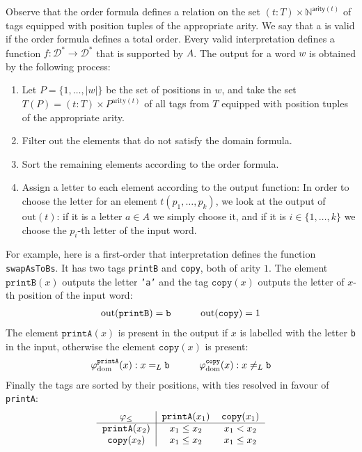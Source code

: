 Observe that the order formula defines a relation on the set $(t : T) \times \mathbb{N}^{\mathsf{arity}(t)}$ of tags 
equipped with position tuples of the appropriate arity. We say that a  is valid if
the order formula defines a total order. Every valid interpretation defines a function $f : \mathcal{D}^* \to \mathcal{D}^*$
that is supported by $A$. The output for a word $w$ is obtained by the following process:
\begin{enumerate}
    \item Let $P = \{1, \ldots, |w|\}$ be the set of positions in $w$, and take the set $T(P) = (t : T) \times P^{\text{arity}(t)}$
           of all tags from $T$ equipped with position tuples of the appropriate arity.
    \item Filter out the elements that do not satisfy the domain formula.
    \item Sort the remaining elements according to the order formula.
    \item Assign a letter to each element according to the output function: 
          In order to choose the letter for an element $t(p_1, \ldots, p_k)$, we look at the 
          output of $\text{out}(t)$: if it is a letter $a \in A$ we simply choose it,
          and if it is $i \in \{1, \ldots, k\}$ we choose the $p_i$-th letter of the input word.
\end{enumerate}

For example, here is a first-order that interpretation defines the function \texttt{swapAsToBs}. 
It has two tags \texttt{printB} and \texttt{copy}, both of arity $1$. 
The element $\mathtt{printB}(x)$ outputs the letter \texttt{'a'} and the tag $\mathtt{copy}(x)$
outputs the letter of $x$-th position of the input word:
\[
\begin{tabular}{ccc}
    $\text{out}(\mathtt{printB}) = \mathtt{b}$ & \ \ \ & $\text{out}(\mathtt{copy}) = 1$ \\
\end{tabular}
\]
The element $\mathtt{printA}(x)$ is present in the output if $x$ is labelled with the letter \texttt{b}
in the input, otherwise the element $\mathtt{copy}(x)$ is present:
\[
\begin{tabular}{ccc}
    $\varphi_{\text{dom}}^{\mathtt{printA}}(x) : x =_L \mathtt{b}$ & \ \ \  &$\varphi_{\text{dom}}^{\mathtt{copy}}(x) : x \neq_L \mathtt{b}$ \\
\end{tabular}
\]
Finally the tags are sorted by their positions, with ties resolved in favour of \texttt{printA}:
\[ 
\begin{tabular}{c|cc}
    $\varphi_{\leq}$ & $\mathtt{printA}(x_1)$ & $\mathtt{copy}(x_1)$ \\
    \hline
    $\mathtt{printA}(x_2)$ & $x_1 \leq x_2$ & $x_1 < x_2$ \\
    $\mathtt{copy}(x_2)$ & $x_1 \leq x_2$ & $x_1 \leq x_2$ \\
\end{tabular}
\]